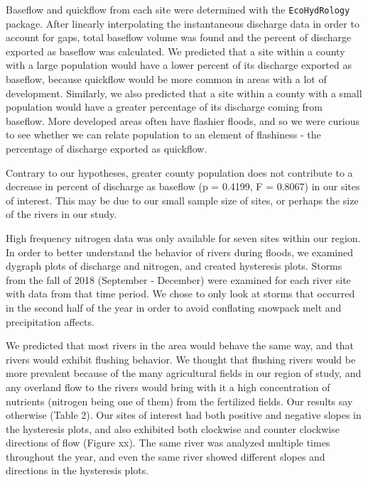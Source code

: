\documentclass[12pt,]{article}
\begin{document}
Baseflow and quickflow from each site were determined with the
\texttt{EcoHydRology} package. After linearly interpolating the
instantaneous discharge data in order to account for gaps, total
baseflow volume was found and the percent of discharge exported as
baseflow was calculated. We predicted that a site within a county with a
large population would have a lower percent of its discharge exported as
baseflow, because quickflow would be more common in areas with a lot of
development. Similarly, we also predicted that a site within a county
with a small population would have a greater percentage of its discharge
coming from baseflow. More developed areas often have flashier floods,
and so we were curious to see whether we can relate population to an
element of flashiness - the percentage of discharge exported as
quickflow.

Contrary to our hypotheses, greater county population does not
contribute to a decrease in percent of discharge as baseflow (p =
0.4199, F = 0.8067) in our sites of interest. This may be due to our
small sample size of sites, or perhaps the size of the rivers in our
study.

High frequency nitrogen data was only available for seven sites within
our region. In order to better understand the behavior of rivers during
floods, we examined dygraph plots of discharge and nitrogen, and created
hysteresis plots. Storms from the fall of 2018 (September - December)
were examined for each river site with data from that time period. We
chose to only look at storms that occurred in the second half of the
year in order to avoid conflating snowpack melt and precipitation
affects.

We predicted that most rivers in the area would behave the same way, and
that rivers would exhibit flushing behavior. We thought that flushing
rivers would be more prevalent because of the many agricultural fields
in our region of study, and any overland flow to the rivers would bring
with it a high concentration of nutrients (nitrogen being one of them)
from the fertilized fields. Our results say otherwise (Table 2). Our
sites of interest had both positive and negative slopes in the
hysteresis plots, and also exhibited both clockwise and counter
clockwise directions of flow (Figure xx). The same river was analyzed
multiple times throughout the year, and even the same river showed
different slopes and directions in the hysteresis plots.
\end{document}
